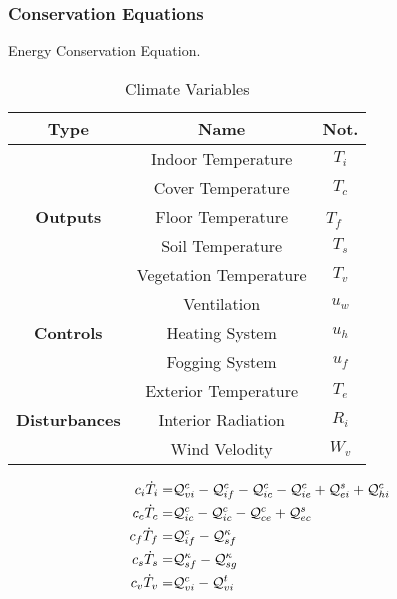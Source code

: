 \documentclass[5p,twocolumn]{elsarticle}
\begin{document}
\subsubsection{Conservation Equations}


Energy Conservation Equation. 

\begin{table}[ht!]
    \centering
    \small
    \begin{tabular}{ccc}
        \textbf{Type} & \textbf{Name} & \textbf{Not.} \\ \hline
        \multirow{5}{*}{\textbf{Outputs}}       & Indoor Temperature       & $T_i$  \\ 
                                                & Cover Temperature        & $T_c$  \\
                                                & Floor Temperature        & $T_f$  \\
                                                & Soil Temperature     & $T_{s}$ \\
                                                & Vegetation Temperature   & $T_v$ \\ \hline
        \multirow{3}{*}{\textbf{Controls}}       & Ventilation                  & $u_w$ \\
                                        & Heating System                   & $u_h$ \\
                                        & Fogging System                   & $u_f$  \\ \hline   
        \multirow{3}{*}{\textbf{Disturbances}}   & Exterior Temperature    & $T_e$ \\
                                        & Interior Radiation       & $R_i$ \\
                                        & Wind Velodity            & $W_v$ \\ \hline
    \end{tabular}
    \caption{Climate Variables}
\end{table}


\begin{gather}
    \begin{aligned}
        c_{i} \dot{T}_i =&\mathcal{Q}^c_{vi} - \mathcal{Q}^c_{if} -  \mathcal{Q}^c_{ic}  - \mathcal{Q}^c_{ie} + \mathcal{Q}^s_{ei} + \mathcal{Q}_{hi}^c \\
        c_{c} \dot{T}_c =&\mathcal{Q}^c_{ic}  -  \mathcal{Q}^c_{ic}  - \mathcal{Q}^c_{ce}  +\mathcal{Q}^s_{ec} \\
        c_{f} \dot{T}_f =&\mathcal{Q}^c_{if} -  \mathcal{Q}^\kappa_{sf}  \\
        c_{s} \dot{T}_s =&\mathcal{Q}^\kappa_{sf} - \mathcal{Q}^\kappa_{sg}  \\
        c_{v} \dot{T}_v =&\mathcal{Q}^c_{vi} - \mathcal{Q}^t_{vi}  
    \end{aligned}
\end{gather}
\end{document}

